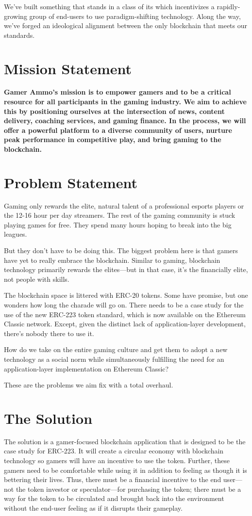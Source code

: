 \documentclass[11pt]{report}
\begin{document}
We've built something that stands in a class of its which incentivizes a rapidly-growing group of end-users to use paradigm-shifting technology. Along the way, we've forged an ideological alignment between the only blockchain that meets our standards.
\section{Mission Statement}
\paragraph{Gamer Ammo's mission is to empower gamers and to be a critical resource for all participants in the gaming industry. We aim to achieve this by positioning ourselves at the intersection of news, content delivery, coaching services, and gaming finance. In the process, we will offer a powerful platform to a diverse community of users, nurture peak performance in competitive play, and bring gaming to the blockchain.}
\section{Problem Statement}
Gaming only rewards the elite, natural talent of a professional esports players or the 12-16 hour per day streamers. The rest of the gaming community is stuck playing games for free. They spend many hours hoping to break into the big leagues.

But they don't have to be doing this. The biggest problem here is that gamers have yet to really embrace the blockchain. Similar to gaming, blockchain technology primarily rewards the elites---but in that case, it's the financially elite, not people with skills.

The blockchain space is littered with ERC-20 tokens. Some have promise, but one wonders how long the charade will go on. There needs to be a case study for the use of the new ERC-223 token standard, which is now available on the Ethereum Classic network. Except, given the distinct lack of application-layer development, there's nobody there to use it.

How do we take on the entire gaming culture and get them to adopt a new technology as a social norm while simultaneously fulfilling the need for an application-layer implementation on Ethereum Classic?

These are the problems we aim fix with a total overhaul.
\section{The Solution}
The solution is a gamer-focused blockchain application that is designed to be the case study for ERC-223. It will create a circular economy with blockchain technology so gamers will have an incentive to use the token. Further, these gamers need to be comfortable while using it in addition to feeling as though it is bettering their lives. Thus, there must be a financial incentive to the end user---not the token investor or speculator---for purchasing the token;  there must be a way for the token to be circulated and brought back into the environment without the end-user feeling as if it disrupts their gameplay.
\end{document}
